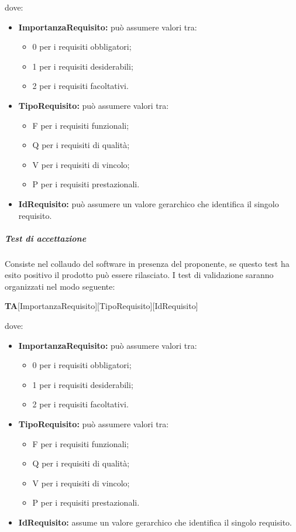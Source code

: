 dove:
\begin{itemize}
		\item \textbf{ImportanzaRequisito:} può assumere valori tra:
	\begin{itemize}
		\item 0 per i requisiti obbligatori;
		\item 1 per i requisiti desiderabili;
		\item 2 per i requisiti facoltativi.
	\end{itemize}

	\item \textbf{TipoRequisito:} può assumere valori tra:
	\begin{itemize}
		\item F per i requisiti funzionali;
		\item Q per i requisiti di qualità;
		\item V per i requisiti di vincolo;
		\item P per i requisiti prestazionali.
	\end{itemize}
	
	\item \textbf{IdRequisito:} può assumere un valore gerarchico che identifica il singolo requisito.
\end{itemize}
\subparagraph{Test di accettazione} \Spazio
Consiste nel collaudo del software in presenza del proponente, se questo test ha esito positivo il prodotto può essere rilasciato.\newline
	I test di validazione saranno organizzati nel modo seguente:\Spazio

\centerline{\textbf{TA}[ImportanzaRequisito][TipoRequisito][IdRequisito]}

dove:
\begin{itemize}
		\item \textbf{ImportanzaRequisito:} può assumere valori tra:
	\begin{itemize}
		\item 0 per i requisiti obbligatori;
		\item 1 per i requisiti desiderabili;		
		\item 2 per i requisiti facoltativi.
	\end{itemize}

	\item \textbf{TipoRequisito:} può assumere valori tra:
	\begin{itemize}
		\item F per i requisiti funzionali;
		\item Q per i requisiti di qualità;
		\item V per i requisiti di vincolo;
		\item P per i requisiti prestazionali.
	\end{itemize}
	
	\item \textbf{IdRequisito:} assume un valore gerarchico che identifica il singolo requisito.
	
\end{itemize}
